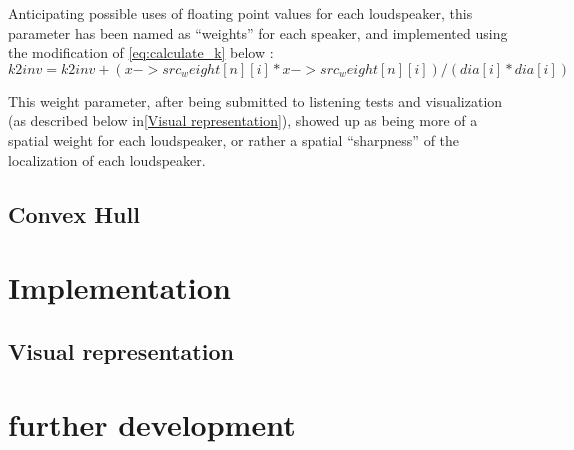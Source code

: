\documentclass[twoside,10pt]{article}
\begin{document}
Anticipating possible uses of floating point values for each loudspeaker, this parameter has been named as ``weights'' for each speaker, and implemented using the modification of \ref{eq:calculate_k} below :
\begin{equation} \label{eq:2Dweight}
k2inv = k2inv + (x->src_weight[n][i]*x->src_weight[n][i])/(dia[i]*dia[i])
\end{equation}

This weight parameter, after being submitted to listening tests and visualization (as described below in\ref{Visual representation}), showed up as being more of a spatial weight for each loudspeaker, or rather a spatial ``sharpness'' of the localization of each loudspeaker.

\subsection{Convex Hull}



\section{Implementation}

\subsection{Visual representation}







\section{further development}




\end{document}
